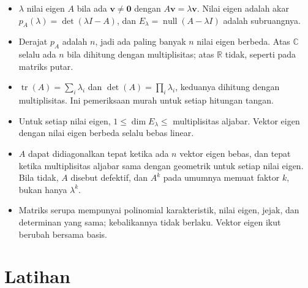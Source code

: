 \begin{ringkasan}
\begin{itemize}
  \item $\lambda$ nilai eigen $A$ bila ada $\mathbf{v}\neq\mathbf{0}$ dengan
        $A\mathbf{v}=\lambda\mathbf{v}$. Nilai eigen adalah akar $p_{A}(\lambda)=\det(\lambda I-A)$,
        dan $E_{\lambda}=\operatorname{null}(A-\lambda I)$ adalah subruangnya.
  \item Derajat $p_{A}$ adalah $n$, jadi ada paling banyak $n$ nilai eigen berbeda. Atas
        $\mathbb{C}$ selalu ada $n$ bila dihitung dengan multiplisitas; atas $\mathbb{R}$ tidak,
        seperti pada matriks putar.
  \item $\operatorname{tr}(A)=\sum_{i}\lambda_{i}$ dan $\det(A)=\prod_{i}\lambda_{i}$, keduanya
        dihitung dengan multiplisitas. Ini pemeriksaan murah untuk setiap hitungan tangan.
  \item Untuk setiap nilai eigen, $1\le\dim E_{\lambda}\le$ multiplisitas aljabar. Vektor eigen
        dengan nilai eigen berbeda selalu bebas linear.
  \item $A$ dapat didiagonalkan tepat ketika ada $n$ vektor eigen bebas, dan tepat ketika
        multiplisitas aljabar sama dengan geometrik untuk setiap nilai eigen. Bila tidak, $A$
        disebut defektif, dan $A^{k}$ pada umumnya memuat faktor $k$, bukan hanya $\lambda^{k}$.
  \item Matriks serupa mempunyai polinomial karakteristik, nilai eigen, jejak, dan determinan
        yang sama; kebalikannya tidak berlaku. Vektor eigen ikut berubah bersama basis.
\end{itemize}
\end{ringkasan}

\section{Latihan}

